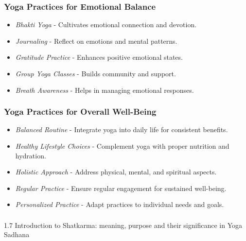 \begin{frame}[fragile]\frametitle{Yoga Practices for Emotional Balance}

      \begin{itemize}
		\item \textit{Bhakti Yoga} - Cultivates emotional connection and devotion.
		\item \textit{Journaling} - Reflect on emotions and mental patterns.
		\item \textit{Gratitude Practice} - Enhances positive emotional states.
		\item \textit{Group Yoga Classes} - Builds community and support.
		\item \textit{Breath Awareness} - Helps in managing emotional responses.
	  \end{itemize}

\end{frame}

\begin{frame}[fragile]\frametitle{Yoga Practices for Overall Well-Being}

      \begin{itemize}
		\item \textit{Balanced Routine} - Integrate yoga into daily life for consistent benefits.
		\item \textit{Healthy Lifestyle Choices} - Complement yoga with proper nutrition and hydration.
		\item \textit{Holistic Approach} - Address physical, mental, and spiritual aspects.
		\item \textit{Regular Practice} - Ensure regular engagement for sustained well-being.
		\item \textit{Personalized Practice} - Adapt practices to individual needs and goals.
	  \end{itemize}

\end{frame}



\begin{frame}[fragile]\frametitle{}
\begin{center}
{\Large 1.7 Introduction to Shatkarma: meaning, purpose and their significance in Yoga Sadhana}
\end{center}
\end{frame}

